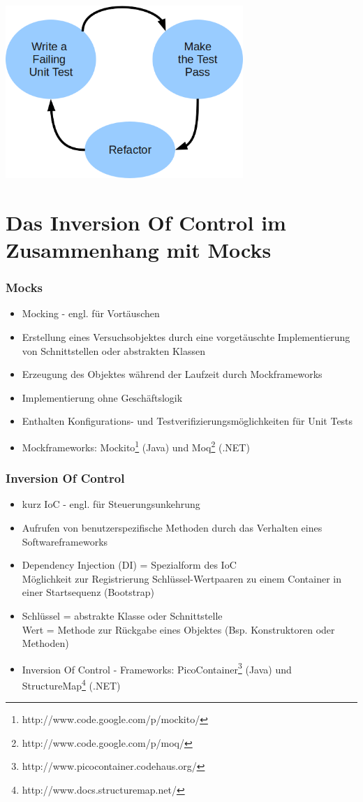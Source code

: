 \documentclass{beamer}
\begin{document}
\begin{frame}
\includegraphics[width=9cm]{TestDrivenDevelopment.png}
\end{frame}

\section{Das Inversion Of Control im Zusammenhang mit Mocks}
\begin{frame}
\frametitle{Mocks}
\begin{itemize}
\item Mocking - engl. für Vortäuschen
\item Erstellung eines Versuchsobjektes durch eine vorgetäuschte Implementierung von Schnittstellen oder abstrakten Klassen
\item Erzeugung des Objektes während der Laufzeit durch Mockframeworks
\item Implementierung ohne Geschäftslogik
\item Enthalten Konfigurations- und Testverifizierungsmöglichkeiten für Unit Tests
\item Mockframeworks: Mockito\footnote{http://www.code.google.com/p/mockito/} (Java) und Moq\footnote{http://www.code.google.com/p/moq/} (.NET)
\end{itemize}
\end{frame}

\begin{frame}
\frametitle{Inversion Of Control}
\begin{itemize}
\item kurz IoC - engl. für Steuerungsunkehrung
\item Aufrufen von benutzerspezifische Methoden durch das Verhalten eines Softwareframeworks
\item Dependency Injection (DI) = Spezialform des IoC\\Möglichkeit zur Registrierung Schlüssel-Wertpaaren zu einem Container in einer Startsequenz (Bootstrap)
\item Schlüssel = abstrakte Klasse oder Schnittstelle\\Wert = Methode zur Rückgabe eines Objektes (Bsp. Konstruktoren oder Methoden)
\item Inversion Of Control - Frameworks:
PicoContainer\footnote{http://www.picocontainer.codehaus.org/} (Java) und StructureMap\footnote{http://www.docs.structuremap.net/} (.NET)
\end{itemize}
\end{frame}
\end{document}
